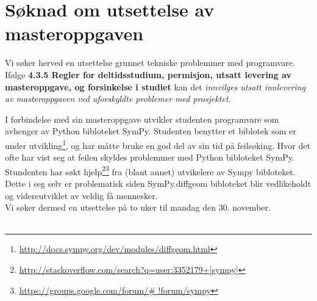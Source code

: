 \documentclass[12pt,twoside,onecolumn]{article}
\begin{document}
\section*{S\o knad om utsettelse av masteroppgaven}
Vi s\o ker herved en utsettelse grunnet tekniske problemmer med programvare. 
If\o lge \textbf{4.3.5 Regler for deltidsstudium, permisjon, utsatt levering av masteroppgave, og forsinkelse i studiet}
kan det \emph{innvilges utsatt innlevering av masteroppgaven ved uforskyldte problemer med prosjektet}.

I forbindelse med sin masteroppgave utvikler studenten programvare som avhenger av Python bibloteket SymPy.
Studenten benytter et biblotek som er under utvikling\footnote{\url{http://docs.sympy.org/dev/modules/diffgeom.html}}, 
og har m\aa tte bruke en god del av sin tid på feils\o king. Hvor det ofte har vist seg at feilen skyldes problemmer med 
Python bibloteket SymPy. Stundenten har s\o kt 
hjelp\footnote{\url{http://stackoverflow.com/search?q=user:3352179+[sympy]}}\footnote{\url{https://groups.google.com/forum/\# !forum/sympy}}
fra (blant annet) utvikelere av Sympy bibloteket. Dette i seg selv er problematisk siden SymPy.diffgeom bibloteket 
blir vedlikeholdt og videreutviklet av veldig f{\aa} mennesker.
\\

Vi s\o ker dermed en utsettelse p{\aa} to uker til mandag den 30. november.
\\
\\

\vspace{60mm}
\end{document}
